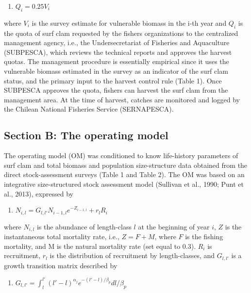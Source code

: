 \documentclass[12pt]{article}
\providecommand{\tightlist}{%
  \setlength{\itemsep}{0pt}\setlength{\parskip}{0pt}}
\begin{document}
\begin{enumerate}
\def\labelenumi{\arabic{enumi})}
\tightlist
\item
  \(Q_i=0.25 V_i\)
\end{enumerate}

where \(V_i\) is the survey estimate for vulnerable biomass in the i-th
year and \(Q_i\) is the quota of surf clam requested by the fishers
organizations to the centralized management agency, i.e., the
Undersecretariat of Fisheries and Aquaculture (SUBPESCA), which reviews
the technical reports and approves the harvest quotas. The management
procedure is essentially empirical since it uses the vulnerable biomass
estimated in the survey as an indicator of the surf clam status, and the
primary input to the harvest control rule (Table 1). Once SUBPESCA
approves the quota, fishers can harvest the surf clam from the
management area. At the time of harvest, catches are monitored and
logged by the Chilean National Fisheries Service (SERNAPESCA).

\hypertarget{section-b-the-operating-model}{%
\subsection{Section B: The operating
model}\label{section-b-the-operating-model}}

The operating model (OM) was conditioned to know life-history parameters
of surf clam and total biomass and population size-structure data
obtained from the direct stock-assessment surveys (Table 1 and Table 2).
The OM was based on an integrative size-structured stock assessment
model (Sullivan et al., 1990; Punt et al., 2013), expressed by

\begin{enumerate}
\def\labelenumi{\arabic{enumi})}
\setcounter{enumi}{1}
\tightlist
\item
  \(N_{i,l}=G_{l,l'} N_{i-1,l} e^{-Z_{i-1,l} }+ r_l R_i\)
\end{enumerate}

where \(N_{i,l}\) is the abundance of length-class \(l\) at the
beginning of year \(i\), \(Z\) is the instantaneous total mortality
rate, i.e., \(Z=F+M\), where \(F\) is the fishing mortality, and M is
the natural mortality rate (set equal to 0.3). \(R_i\) is recruitment,
\(r_l\) is the distribution of recruitment by length-classes, and
\(G_{l,l'}\) is a growth transition matrix described by

\begin{enumerate}
\def\labelenumi{\arabic{enumi})}
\setcounter{enumi}{2}
\tightlist
\item
  \(G_{l,l'}=\int_l^{l'} (l'-l)^{\alpha_j} e^{-(l'-l)/\beta_p } dl/\beta_p\)
\end{enumerate}
\end{document}
